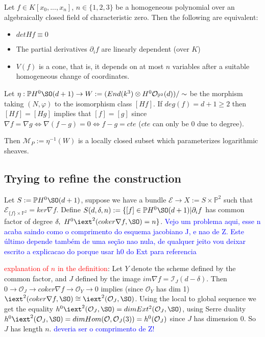 \begin{theorem}\cite{Lossen2004WhenDT}
Let $f \in K[x_0,...,x_n]$, $n \in \{1, 2, 3\}$ be a homogeneous polynomial over an algebraically closed field of characteristic zero. Then the following are equivalent:

\begin{itemize}
    \item $det Hf \equiv 0$
    \item The partial derivatives $\partial_i f$ are linearly dependent (over $K$)
    \item $V(f)$ is a cone, that is, it depends on at most $n$ variables after a suitable homogeneous change of coordinates.
\end{itemize}
\end{theorem}

Let $\eta : \mathbb{P}H^0 \SO(d+1) \to W:= (End(k^3) \otimes H^0\mathcal{O}_{\mathbb{P}^2}(d))/\sim$ be the morphism taking $(N,\varphi)$ to the isomorphism class $[H f]$. If $deg(f)=d+1 \geq 2$ then $[H f] = [H g]$ implies that $[f]=[g]$ since $\nabla f = \nabla g \iff \nabla(f-g)=0 \iff f-g=cte$ ($cte$ can only be $0$ due to degree).

Then $\mathcal{M}_P := \eta^{-1}(W)$ is a locally closed subset which parameterizes logarithmic sheaves.

\subsection{Trying to refine the construction}

Let $S:=\mathbb{P}H^0 \SO(d+1)$, suppose we have a bundle $\mathcal{E} \to X:=S \times \mathbb{P}^2$ such that $\mathcal{E}_{\{f\}\times \mathbb{P}^2}=ker \nabla f$. Define $S(d,\delta,n):= \{[f] \in \mathbb{P} H^0 \SO(d+1) |\partial_i f$ has common factor of degree $\delta, \ H^0 \iext^2( coker \nabla f,\SO)=n   \}$. \textcolor{blue}{Vejo um problema aqui, esse n acaba saindo como o comprimento do esquema jacobiano J, e nao de Z. Este último depende também de uma seção nao nula, de qualquer jeito vou deixar escrito a explicacao do porque usar h0 do Ext para referencia}

\begin{remark}
\textcolor{red}{explanation of $n$ in the definition}: Let $Y$ denote the scheme defined by the common factor, and $J$ defined by the image $im \nabla f = \mathcal{I}_J(d-\delta)$. Then $0 \to \mathcal{O}_J \to coker \nabla f \to \mathcal{O}_Y \to 0$ implies (since $\mathcal{O}_Y$ has dim 1) $\iext^2(coker \nabla f,\SO) \cong \iext^2(\mathcal{O}_J,\SO)$. Using the local to global sequence we get the equality $h^0\iext^2(\mathcal{O}_J,\SO) = dim Ext^2(\mathcal{O}_J,\SO)$, using Serre duality $h^0 \iext^2(\mathcal{O}_J,\SO) = dim Hom(\mathcal{O},\mathcal{O}_J(3))=h^0(\mathcal{O}_J)$ since $J$ has dimension $0$. So $J$ has length $n$. \textcolor{blue}{deveria ser o comprimento de Z!}
\end{remark}

